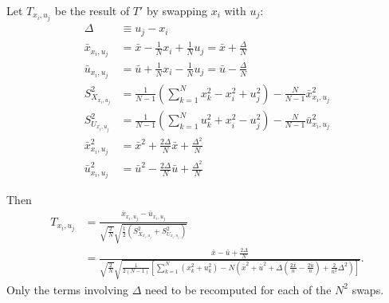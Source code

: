 Let $T_{x_i,u_j}$ be the result of $T'$ by swapping $x_i$ with $u_j$:
\begin{align*}
  \Delta &\equiv u_j-x_i \\
  \bar{x}_{x_i,u_j} &= \bar{x}-\frac{1}{N}x_i+\frac{1}{N}u_j =
  \bar{x}+\frac{\Delta}{N} \\
  \bar{u}_{x_i,u_j} &= \bar{u}+\frac{1}{N}x_i-\frac{1}{N}u_j =
  \bar{u}-\frac{\Delta}{N} \\
  S_{X_{x_i,u_j}}^2 &= \frac{1}{N-1}(\sum_{k=1}^N x_k^2 - x_i^2 +
  u_j^2) - \frac{N}{N-1}\bar{x}^2_{x_i,u_j} \\
  S_{U_{x_i,u_j}}^2 &= \frac{1}{N-1}(\sum_{k=1}^N u_k^2 + x_i^2 -
  u_j^2) - \frac{N}{N-1}\bar{u}^2_{x_i,u_j} \\
  \bar{x}_{x_i,u_j}^2 &= \bar{x}^2 + \frac{2\Delta}{N}\bar{x} +
  \frac{\Delta^2}{N} \\
  \bar{u}_{x_i,u_j}^2 &= \bar{u}^2 - \frac{2\Delta}{N}\bar{u} + \frac{\Delta^2}{N}
\end{align*}

Then
\begin{align*}
  T_{x_i,u_j} &= \frac{\bar{x}_{x_i,u_j}-\bar{u}_{x_i,u_j}}
  {\sqrt{\frac{2}{N}}\sqrt{\frac{1}{2}(S_{X_{x_i,u_j}}^2+S_{U_{x_i,u_j}}^2)}}\\
  &= \frac{\bar{x}-\bar{u}+\frac{2\Delta}{N}}
  {\sqrt{\frac{2}{N}}\sqrt{\frac{1}{2(N-1)}[\sum_{k=1}^N (x_k^2+u_k^2)
      -N(\bar{x}^2+\bar{u}^2+\Delta(\frac{2\bar{x}}{n}
      -\frac{2\bar{u}}{n})+\frac{2}{n^2}\Delta^2)]}}.
\end{align*}
Only the terms involving $\Delta$ need to be recomputed for each of the $N^2$ swaps.
